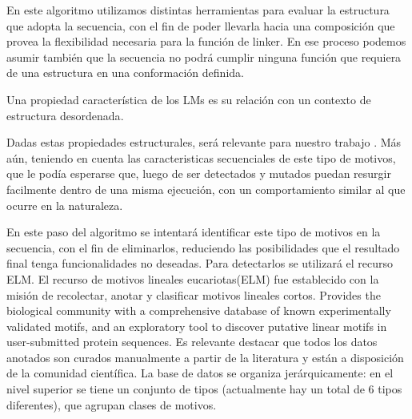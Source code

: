 En este algoritmo utilizamos distintas herramientas para evaluar la estructura que adopta la secuencia, con el fin de poder llevarla hacia una composición que provea la flexibilidad
necesaria para la función de linker. En ese proceso podemos asumir también que la secuencia no podrá cumplir ninguna función que requiera de una estructura en una conformación definida.


Una propiedad característica de los LMs es su relación con un contexto de estructura desordenada\cite{fuxreiter2007local}.

Dadas estas propiedades estructurales, será relevante para nuestro trabajo . Más aún, teniendo en cuenta las caracteristicas secuenciales de este tipo de motivos, que le 
podía esperarse que, luego de ser detectados y mutados puedan resurgir facilmente dentro de una misma ejecución, con un comportamiento similar al que ocurre en la naturaleza.





En este paso del algoritmo se intentará identificar este tipo de motivos en la secuencia, con el fin de eliminarlos, reduciendo las posibilidades que el resultado final tenga funcionalidades no deseadas. 
Para detectarlos se utilizará el recurso ELM.
El recurso de motivos lineales eucariotas(ELM) \cite{puntervoll2003elm,dinkel2013eukaryotic} fue establecido con la misión de recolectar, anotar y clasificar motivos lineales cortos. 
Provides the biological community with a comprehensive database of known experimentally validated motifs, and an exploratory tool to discover putative linear motifs in user-submitted protein sequences.
Es relevante destacar que todos los datos anotados son curados manualmente a partir de la literatura y están a disposición de la comunidad científica.
La base de datos se organiza jerárquicamente: en el nivel superior se tiene un conjunto de tipos (actualmente hay un total de 6 tipos diferentes), que agrupan clases de motivos. 

